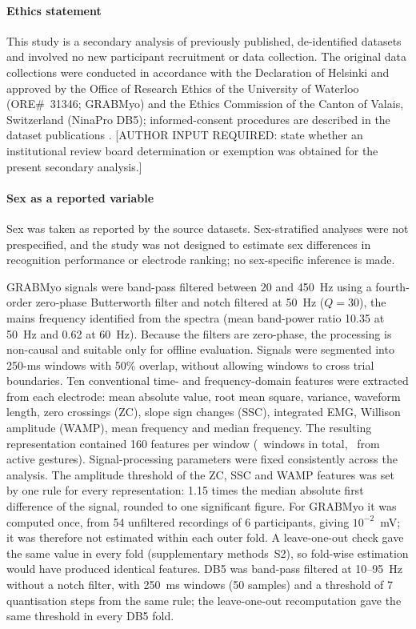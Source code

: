 \paragraph{Ethics statement} This study is a secondary analysis of previously published, de-identified datasets and involved no new participant recruitment or data collection. The original data collections were conducted in accordance with the Declaration of Helsinki and approved by the Office of Research Ethics of the University of Waterloo (ORE\#~31346; GRABMyo) and the Ethics Commission of the Canton of Valais, Switzerland (NinaPro DB5); informed-consent procedures are described in the dataset publications \citep{pradhan2022multiday,pizzolato2017comparison}. [AUTHOR INPUT REQUIRED: state whether an institutional review board determination or exemption was obtained for the present secondary analysis.]

\paragraph{Sex as a reported variable} Sex was taken as reported by the source datasets. Sex-stratified analyses were not prespecified, and the study was not designed to estimate sex differences in recognition performance or electrode ranking; no sex-specific inference is made.

GRABMyo signals were band-pass filtered between 20 and 450~Hz using a fourth-order zero-phase Butterworth filter and notch filtered at 50~Hz ($Q = 30$), the mains frequency identified from the spectra (mean band-power ratio 10.35 at 50~Hz and 0.62 at 60~Hz). Because the filters are zero-phase, the processing is non-causal and suitable only for offline evaluation. Signals were segmented into 250-ms windows with 50\% overlap, without allowing windows to cross trial boundaries. Ten conventional time- and frequency-domain features were extracted from each electrode: mean absolute value, root mean square, variance, waveform length, zero crossings (ZC), slope sign changes (SSC), integrated EMG, Willison amplitude (WAMP), mean frequency and median frequency. The resulting representation contained 160 features per window (\GRABMyoWindows\ windows in total, \GRABMyoActiveWindows\ from active gestures). Signal-processing parameters were fixed consistently across the analysis. The amplitude threshold of the ZC, SSC and WAMP features was set by one rule for every representation: 1.15 times the median absolute first difference of the signal, rounded to one significant figure. For GRABMyo it was computed once, from 54 unfiltered recordings of 6 participants, giving $10^{-2}$~mV; it was therefore not estimated within each outer fold. A leave-one-out check gave the same value in every fold (supplementary methods~S2), so fold-wise estimation would have produced identical features. DB5 was band-pass filtered at 10--95~Hz without a notch filter, with 250~ms windows (50 samples) and a threshold of 7 quantisation steps from the same rule; the leave-one-out recomputation gave the same threshold in every DB5 fold.

